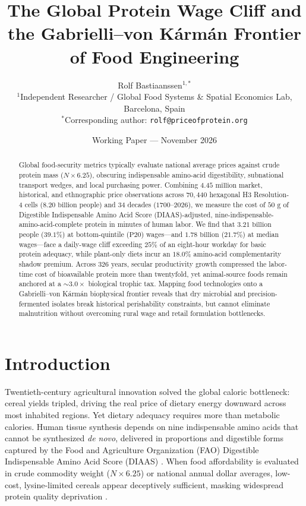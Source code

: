 \documentclass[11pt,a4paper]{article}
\title{\textbf{The Global Protein Wage Cliff and the Gabrielli--von K\'arm\'an Frontier of Food Engineering}}
\author{
Rolf Bastiaanssen$^{1,*}$ \\
\small $^{1}$Independent Researcher / Global Food Systems \& Spatial Economics Lab, Barcelona, Spain \\
\small $^{*}$Corresponding author: \texttt{rolf@priceofprotein.org}
}
\date{Working Paper --- November 2026}
\begin{document}
\maketitle

\begin{abstract}
Global food-security metrics typically evaluate national average prices against crude protein mass ($N \times 6.25$), obscuring indispensable amino-acid digestibility, subnational transport wedges, and local purchasing power. Combining $4.45\text{ million}$ market, historical, and ethnographic price observations across $70{,}440$ hexagonal H3 Resolution-4 cells ($8.20\text{ billion}$ people) and $34$ decades ($1700\text{--}2026$), we measure the cost of $50\text{ g}$ of Digestible Indispensable Amino Acid Score (DIAAS)-adjusted, nine-indispensable-amino-acid-complete protein in minutes of human labor. We find that $3.21\text{ billion}$ people ($39.1\%$) at bottom-quintile ($\text{P20}$) wages---and $1.78\text{ billion}$ ($21.7\%$) at median wages---face a daily-wage cliff exceeding $25\%$ of an eight-hour workday for basic protein adequacy, while plant-only diets incur an $18.0\%$ amino-acid complementarity shadow premium. Across $326\text{ years}$, secular productivity growth compressed the labor-time cost of bioavailable protein more than twentyfold, yet animal-source foods remain anchored at a $\sim 3.0\times$ biological trophic tax. Mapping food technologies onto a Gabrielli--von Kárm\'an biophysical frontier reveals that dry microbial and precision-fermented isolates break historical perishability constraints, but cannot eliminate malnutrition without overcoming rural wage and retail formulation bottlenecks.
\end{abstract}

\section{Introduction}

Twentieth-century agricultural innovation solved the global caloric bottleneck: cereal yields tripled, driving the real price of dietary energy downward across most inhabited regions. Yet dietary adequacy requires more than metabolic calories. Human tissue synthesis depends on nine indispensable amino acids that cannot be synthesized \textit{de novo}, delivered in proportions and digestible forms captured by the Food and Agriculture Organization (FAO) Digestible Indispensable Amino Acid Score (DIAAS) \cite{fao2013}. When food affordability is evaluated in crude commodity weight ($N \times 6.25$) or national annual dollar averages, low-cost, lysine-limited cereals appear deceptively sufficient, masking widespread protein quality deprivation \cite{headey2019,bai2021}.
\end{document}
